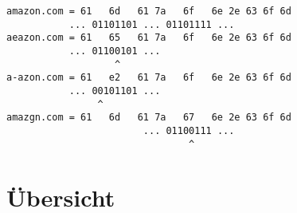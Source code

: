 \begin{lstlisting}[caption={Drei mögliche BitSquatting-Domänen für die Zieldomäne \texttt{amazon.com}}, label={lst:bitquatting}]
amazon.com = 61   6d   61 7a   6f   6e 2e 63 6f 6d
           ... 01101101 ... 01101111 ... 
aeazon.com = 61   65   61 7a   6f   6e 2e 63 6f 6d  
           ... 01100101 ...
                   ^
a-azon.com = 61   e2   61 7a   6f   6e 2e 63 6f 6d 
           ... 00101101 ...
                ^
amazgn.com = 61   6d   61 7a   67   6e 2e 63 6f 6d
                        ... 01100111 ...
                                ^
\end{lstlisting}

\section{Übersicht}
\label{sec:Attacks-Summary}

